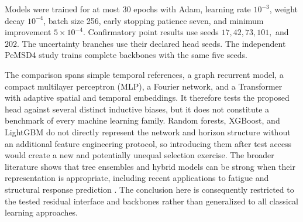 \documentclass[pdflatex,sn-mathphys-num]{sn-jnl}
\begin{document}
Models were trained for at most 30 epochs with Adam, learning rate \(10^{-3}\), weight decay \(10^{-4}\), batch size 256, early stopping patience seven, and minimum improvement \(5\times10^{-4}\). Confirmatory point results use seeds \(17,42,73,101,\) and \(202\). The uncertainty branches use their declared head seeds. The independent PeMSD4 study trains complete backbones with the same five seeds.

The comparison spans simple temporal references, a graph recurrent model, a compact multilayer perceptron (MLP), a Fourier network, and a Transformer with adaptive spatial and temporal embeddings. It therefore tests the proposed head against several distinct inductive biases, but it does not constitute a benchmark of every machine learning family. Random forests, XGBoost, and LightGBM do not directly represent the network and horizon structure without an additional feature engineering protocol, so introducing them after test access would create a new and potentially unequal selection exercise. The broader literature shows that tree ensembles and hybrid models can be strong when their representation is appropriate, including recent applications to fatigue and structural response prediction \cite{naeim2025fatigue,akbarzadeh2025fragility,akbarzadeh2026multihazard}. The conclusion here is consequently restricted to the tested residual interface and backbones rather than generalized to all classical learning approaches.

\begin{table}[t]
\caption{Optimization and tuning disclosure. The official STAEformer architecture was adopted without an architecture search. The nine quantum size configurations form a sensitivity analysis and did not retrospectively replace the four qubit, depth two reference treatment.}\label{tab:tuning}
\centering
\scriptsize
{}
\end{table}
\end{document}
